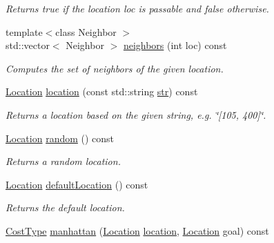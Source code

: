 \begin{DoxyCompactItemize}
\begin{DoxyCompactList}\small\item\em Returns {\ttfamily true} if the location {\ttfamily loc} is passable and {\ttfamily false} otherwise. \end{DoxyCompactList}\item 
{\footnotesize template$<$class Neighbor $>$ }\\std\+::vector$<$ Neighbor $>$ \hyperlink{structsb_1_1GridMap_a7d2781879f2970f48e38511ce2a002b9}{neighbors} (int loc) const 
\begin{DoxyCompactList}\small\item\em Computes the set of neighbors of the given location. \end{DoxyCompactList}\item 
\hyperlink{structsb_1_1GridMap_aae073ca1668a117e37279473fff789d1}{Location} \hyperlink{structsb_1_1GridMap_abfb29cd5d027ed4647b22c917788a27a}{location} (const std\+::string \hyperlink{stream_8h_abd521cb1f3daa92e2c4348f64c0b0b26}{str}) const 
\begin{DoxyCompactList}\small\item\em Returns a location based on the given string, e.\+g. \char`\"{}\mbox{[}105, 400\mbox{]}\char`\"{}. \end{DoxyCompactList}\item 
\hyperlink{structsb_1_1GridMap_aae073ca1668a117e37279473fff789d1}{Location} \hyperlink{structsb_1_1GridMap_aa01a812f9deae8d8178e7e465af565ff}{random} () const 
\begin{DoxyCompactList}\small\item\em Returns a random location. \end{DoxyCompactList}\item 
\hyperlink{structsb_1_1GridMap_aae073ca1668a117e37279473fff789d1}{Location} \hyperlink{structsb_1_1GridMap_a4702ee14816164fe4a33aeedafa2abe7}{default\+Location} () const 
\begin{DoxyCompactList}\small\item\em Returns the default location. \end{DoxyCompactList}\item 
\hyperlink{structsb_1_1GridMap_a9121a2d39b061441b297927937e87083}{Cost\+Type} \hyperlink{structsb_1_1GridMap_a270534b926a0e1e5b54993f69b5b50e7}{manhattan} (\hyperlink{structsb_1_1GridMap_aae073ca1668a117e37279473fff789d1}{Location} \hyperlink{structsb_1_1GridMap_af1f0641e6445bc37766d044a8f51f6ac}{location}, \hyperlink{structsb_1_1GridMap_aae073ca1668a117e37279473fff789d1}{Location} goal) const 

\end{DoxyCompactItemize}
